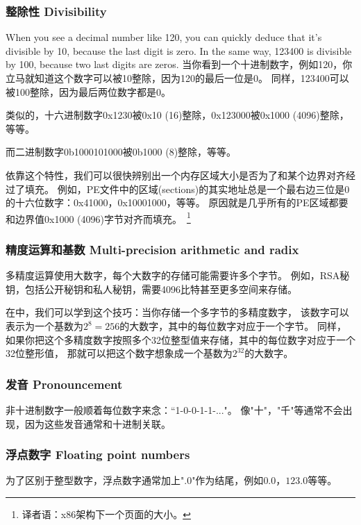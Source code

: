 \documentclass[UTF8,nofonts]{ctexart}
\begin{document}
\subsubsection{整除性 Divisibility}

When you see a decimal number like 120, you can quickly deduce that it's divisible by 10, because the last digit is zero.
In the same way, 123400 is divisible by 100, because two last digits are zeros.
当你看到一个十进制数字，例如120，你立马就知道这个数字可以被10整除，因为120的最后一位是0。
同样，123400可以被100整除，因为最后两位数字都是0。

类似的，十六进制数字0x1230被0x10 (16)整除，0x123000被0x1000 (4096)整除，等等。

而二进制数字0b1000101000被0b1000 (8)整除，等等。

依靠这个特性，我们可以很快辨别出一个内存区域大小是否为了和某个边界对齐经过了填充。
例如，\ac{PE}文件中的区域(sections)的其实地址总是一个最右边三位是0的十六位数字：0x41000，0x10001000，等等。
原因就是几乎所有的\ac{PE}区域都要和边界值0x1000 (4096)字节对齐而填充。~\footnote{译者语：x86架构下一个页面的大小。}

\subsubsection{精度运算和基数 Multi-precision arithmetic and radix}

多精度运算使用大数字，每个大数字的存储可能需要许多个字节。
例如，RSA秘钥，包括公开秘钥和私人秘钥，需要4096比特甚至更多空间来存储。

在中，我们可以学到这个技巧：当你存储一个多字节的多精度数字，
该数字可以表示为一个基数为$2^8=256$的大数字，其中的每位数字对应于一个字节。
同样，如果你把这个多精度数字按照多个32位整型值来存储，其中的每位数字对应于一个32位整形值，
那就可以把这个数字想象成一个基数为$2^{32}$的大数字。

\subsubsection{发音 Pronouncement}

非十进制数字一般顺着每位数字来念：“1-0-0-1-1-..."。
像"十"，"千"等通常不会出现，因为这些发音通常和十进制关联。

\subsubsection{浮点数字 Floating point numbers}

为了区别于整型数字，浮点数字通常加上".0"作为结尾，例如$0.0$，$123.0$等等。
\end{document}
